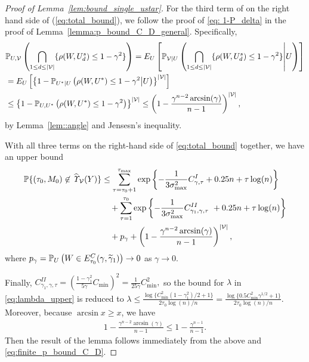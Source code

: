 \documentclass[10pt,a4paper]{amsart}
\def\P{\mathbb P}
\begin{document}
\begin{proof}[Proof of Lemma~\ref{lem:bound_single_ustar}]
For the third term of on the right hand side of (\ref{eq:total_bound}), we follow the proof of \eqref{eq: 1-P_delta} in the proof of  Lemma~\ref{lemma:p_bound_C_D_general}. Specifically, 
\begin{align*}
   & \P_{\*U,\mathcal V} \left(\bigcap_{1 \leq d \leq |\mathcal V|}\{\rho(\*W,\*U^s_d) \leq 1 - \gamma^2 \}\right) = E_{\*U}\left[ \P_{\mathcal V|\*U} \left(\bigcap_{1 \leq d \leq |\mathcal V|}\{\rho(\*W,\*U^s_d) \leq 1 - \gamma^2 \} \middle | \*U\right)\right] \\
  &  =  E_{\*U}\left[ \left\{1 - \P_{\*U^*|\*U} \left(\rho(\*W,\*U^*) \leq 1 - \gamma^2  \middle | \*U\right)\right\}^{|\mathcal V|}\right] \\
  & \leq \left\{1 - \P_{\*U,\*U^*} \left(\rho(\*W,\*U^*) \leq 1 - \gamma^2  \right)\right\}^{|\mathcal V|} \leq \left(1-\frac{\gamma^{n-2}\arcsin (\gamma)}{n-1}\right)^{|{\mathcal V}|},
\end{align*}
by Lemma~\ref{lem::angle} and Jensesn's inequality. 



With all three terms on the right-hand side of \eqref{eq:total_bound} together, we have an upper bound
\begin{align}
\label{eq:finite_p_bound_C_D}
     \P\{(\tau_0, \*M_0) \not\in \widehat{\it \Upsilon}_{{\mathcal V}}(\*Y)\} & \leq 
     \sum^{\tau_{\max}}_{\tau=\tau_0+1}
    \exp\left\{-\frac{1}{3\sigma^2_{\max}} C^I_{\gamma, \tau} + 0.25n +  \tau\log(n) \right\} \nonumber \\
    & \quad  +  \sum_{\tau=1}^{\tau_0} \exp\left\{-\frac{1}{3\sigma^2_{\max}} C^{II}_{\gamma_1,\gamma, \tau}\ + 0.25n + \tau\log(n)\right\}\nonumber\\
     & \quad 
     + p_\gamma  +  \left(1-\frac{\gamma^{n-2}\arcsin (\gamma)}{n-1}\right)^{|{\mathcal V}|},
\end{align}
where $p_\gamma = \P_{\*U}\left(\*W \in E^C_{\tau_0}( \gamma, \widetilde \gamma_1)\right) \rightarrow 0$ as $\gamma \rightarrow 0.$

 Finally, 
 $C^{II}_{\gamma_1,\gamma, \tau} = \left(\frac{1-\gamma_1^2}{5\gamma}C_{\min}\right)^2 = \frac{1}{25\gamma} C^2_{\min},$  so the bound for $\lambda$ in \eqref{eq:lambda_upper} is reduced to   $\lambda \leq \frac{\log\{C^2_{\min}(1- \gamma^2_1)/2 + 1\}}{2 \tau_0 \log(n)/n} = \frac{\log\{0.5C^2_{\min}\gamma^{1/2} + 1\}}{2 \tau_0 \log(n)/n} .$
Moreover, because $\arcsin x \geq x$, we have
\begin{align*}
    1-\frac{\gamma^{n-2}\arcsin (\gamma)}{n-1} \leq 1-\frac{\gamma^{n-1}}{n-1}.
\end{align*}
Then the result of the lemma  
follows immediately from the above and \eqref{eq:finite_p_bound_C_D}.

\end{proof}
\end{document}

